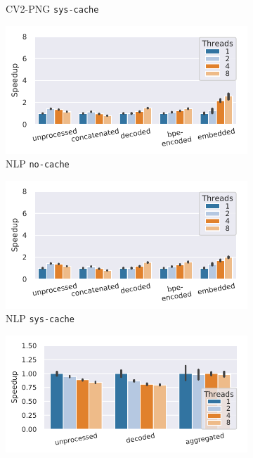 {\begin{figure}
\begin{subfigure}[c]{0.22\textwidth}
        \vspace{-18pt}
        \caption{CV2-PNG \texttt{sys-cache}}
        \label{fig:speedup-epochs-cv2-png}
    \end{subfigure}
    \begin{subfigure}[c]{0.22\textwidth}
        \includegraphics[width=\textwidth]{figures/openwebtext-pipeline/speedup-8000-samples-epoch-0.pdf}
        \vspace{-18pt}
        \caption{NLP \texttt{no-cache}}
        \label{fig:speedup-nlp}
    \end{subfigure}
    \begin{subfigure}[c]{0.22\textwidth}
        \includegraphics[width=\textwidth]{figures/openwebtext-pipeline/speedup-8000-samples-epoch-1.pdf}
        \vspace{-18pt}
        \caption{NLP \texttt{sys-cache}}
        \label{fig:speedup-epochs-nlp}
    \end{subfigure}
    \begin{subfigure}[c]{0.22\textwidth}
        \includegraphics[width=\textwidth]{figures/cream-pipeline/speedup-8000-samples-epoch-0.pdf}

\end{subfigure}
\end{figure}}
